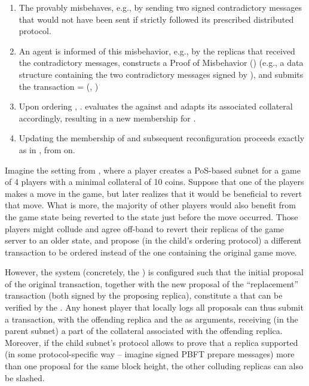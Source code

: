 \begin{enumerate}
    
    \item The  provably misbehaves, e.g., by sending two signed contradictory messages
    that would not have been sent if  strictly followed its prescribed distributed protocol.

    \item An \ipc agent is informed of this misbehavior, e.g., by the replicas that received the contradictory messages,
    constructs a Proof of Misbehavior () (e.g., a data structure containing the two contradictory messages signed by ),
    and submits the transaction  = (, )

    \item Upon ordering , . evaluates the  against 
    and adapts its associated collateral accordingly, resulting in a new membership for .

    \item Updating the membership of  and subsequent reconfiguration proceeds exactly as in , from  on.

\end{enumerate}

\begin{example}
Imagine the setting from , where a player creates a PoS-based subnet for a game of 4 players with a minimal collateral of 10 coins.
Suppose that one of the players makes a move in the game, but later realizes that it would be beneficial to revert that move.
What is more, the majority of other players would also benefit from the game state being reverted to the state just before the move occurred.
Those players might collude and agree off-band to revert their replicas of the game server to an older state,
and propose (in the child's ordering protocol) a different transaction to be ordered instead of the one containing the original game move.

However, the system (concretely, the \saFull) is configured such that the initial proposal of the original transaction,
together with the new proposal of the ``replacement'' transaction (both signed by the proposing replica),
constitute a \pom that can be verified by the \sa.
Any honest player that locally logs all proposals can thus submit a  transaction, with the offending replica and the \pom as arguments,
receiving (in the parent subnet) a part of the collateral associated with the offending replica.
Moreover, if the child subnet's protocol allows to prove that a replica supported
(in some protocol-specific way -- imagine signed PBFT prepare messages)
more than one proposal for the same block height, the other colluding replicas can also be slashed.
\end{example}

